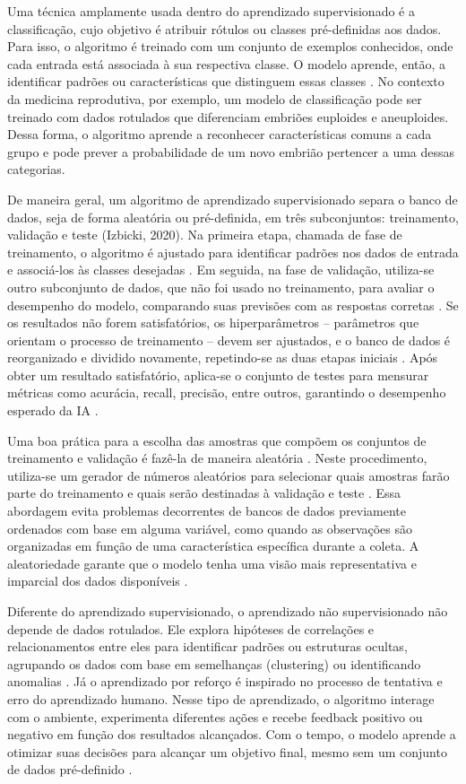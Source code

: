 Uma técnica amplamente usada dentro do aprendizado supervisionado é a classificação, cujo objetivo é atribuir rótulos ou classes pré-definidas aos dados. Para isso, o algoritmo é treinado com um conjunto de exemplos conhecidos, onde cada entrada está associada à sua respectiva classe. O modelo aprende, então, a identificar padrões ou características que distinguem essas classes \cite{izbicki2020}. No contexto da medicina reprodutiva, por exemplo, um modelo de classificação pode ser treinado com dados rotulados que diferenciam embriões euploides e aneuploides. Dessa forma, o algoritmo aprende a reconhecer características comuns a cada grupo e pode prever a probabilidade de um novo embrião pertencer a uma dessas categorias.

De maneira geral, um algoritmo de aprendizado supervisionado separa o banco de dados, seja de forma aleatória ou pré-definida, em três subconjuntos: treinamento, validação e teste (Izbicki, 2020). Na primeira etapa, chamada de fase de treinamento, o algoritmo é ajustado para identificar padrões nos dados de entrada e associá-los às classes desejadas \cite{izbicki2020}. Em seguida, na fase de validação, utiliza-se outro subconjunto de dados, que não foi usado no treinamento, para avaliar o desempenho do modelo, comparando suas previsões com as respostas corretas \cite{izbicki2020}. Se os resultados não forem satisfatórios, os hiperparâmetros – parâmetros que orientam o processo de treinamento – devem ser ajustados, e o banco de dados é reorganizado e dividido novamente, repetindo-se as duas etapas iniciais \cite{izbicki2020}. Após obter um resultado satisfatório, aplica-se o conjunto de testes para mensurar métricas como acurácia, recall, precisão, entre outros, garantindo o desempenho esperado da IA \cite{izbicki2020}.

Uma boa prática para a escolha das amostras que compõem os conjuntos de treinamento e validação é fazê-la de maneira aleatória \cite{izbicki2020}. Neste procedimento, utiliza-se um gerador de números aleatórios para selecionar quais amostras farão parte do treinamento e quais serão destinadas à validação e teste \cite{izbicki2020}. Essa abordagem evita problemas decorrentes de bancos de dados previamente ordenados com base em alguma variável, como quando as observações são organizadas em função de uma característica específica durante a coleta. A aleatoriedade garante que o modelo tenha uma visão mais representativa e imparcial dos dados disponíveis \cite{izbicki2020}.

Diferente do aprendizado supervisionado, o aprendizado não supervisionado não depende de dados rotulados. Ele explora hipóteses de correlações e relacionamentos entre eles para identificar padrões ou estruturas ocultas, agrupando os dados com base em semelhanças (clustering) ou identificando anomalias \cite{russell2016, trask2019}. Já o aprendizado por reforço é inspirado no processo de tentativa e erro do aprendizado humano. Nesse tipo de aprendizado,  o algoritmo interage com o ambiente, experimenta diferentes ações e recebe feedback positivo ou negativo em função dos resultados alcançados. Com o tempo, o modelo aprende a otimizar suas decisões para alcançar um objetivo final, mesmo sem um conjunto de dados pré-definido \cite{risala2023}.

